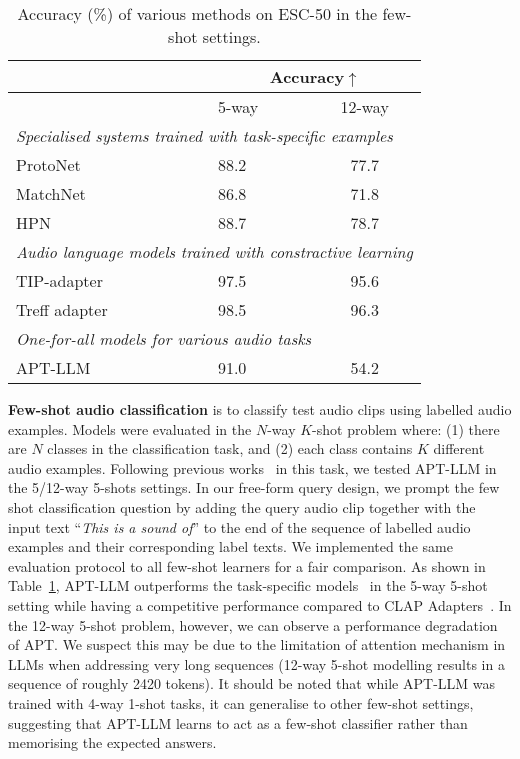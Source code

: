 \documentclass{article} %
\begin{document}
\begin{table}[h]
\centering
\caption{Accuracy (\%) of various methods on ESC-50 in the few-shot settings.}
\label{tab.:few_shot}
\begin{tabular}{llc}
\toprule
                                          & \multicolumn{2}{c}{Accuracy$\uparrow$} \\ \hline
                                          & 5-way          & 12-way         \\ \cline{2-3}
\multicolumn{3}{l}{\textit{Specialised systems trained with task-specific examples}} \\
ProtoNet~\citep{snell_prototypical_2017}   & 88.2          & 77.7          \\
MatchNet~\citep{vinyals_matching_2016}     & 86.8          & 71.8          \\
HPN~\citep{liang_leveraging_2022}          & 88.7          & 78.7          \\ \midrule
\multicolumn{3}{l}{\textit{Audio language models trained with constractive learning}} \\
TIP-adapter~\citep{zhang_tip-adapter_2022} & 97.5          & 95.6          \\
Treff adapter~\citep{liang_adapting_2023}  & 98.5          & 96.3          \\ \midrule
\multicolumn{3}{l}{\textit{One-for-all models for various audio tasks}} \\
\rowcolor{lightgray!60}
APT-LLM                                & 91.0          & 54.2          \\ \bottomrule
\end{tabular}
\end{table}

\textbf{Few-shot audio classification} is to classify test audio clips using labelled audio examples. Models were evaluated in the $N$-way $K$-shot problem where: (1) there are $N$ classes in the classification task, and (2) each class contains $K$ different audio examples. Following previous works~\citep{liang_adapting_2023} in this task, we tested APT-LLM in the 5/12-way 5-shots settings. In our free-form query design, we prompt the few shot classification question by adding the query audio clip together with the input text ``\textit{This is a sound of}'' to the end of the sequence of labelled audio examples and their corresponding label texts. We implemented the same evaluation protocol to all few-shot learners for a fair comparison. As shown in Table~\ref{tab.:few_shot}, APT-LLM outperforms the task-specific models~\citep{snell_prototypical_2017,vinyals_matching_2016,liang_leveraging_2022} in the 5-way 5-shot setting while having a competitive performance compared to CLAP Adapters~\citep{zhang_tip-adapter_2022,liang_adapting_2023}. In the 12-way 5-shot problem, however, we can observe a performance degradation of APT. We suspect this may be due to the limitation of attention mechanism in LLMs when addressing very long sequences (12-way 5-shot modelling results in a sequence of roughly 2420 tokens). It should be noted that while APT-LLM was trained with 4-way 1-shot tasks, it can generalise to other few-shot settings, suggesting that APT-LLM learns to act as a few-shot classifier rather than memorising the expected answers.
\end{document}
